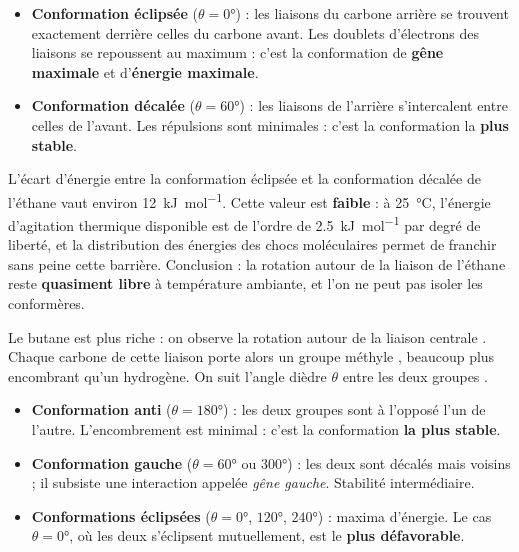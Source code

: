 \documentclass[11pt]{article}
\newcounter{popsec}
\newcounter{popsub}
\newcommand{\courssub}[1]{%
  \stepcounter{popsub}%
  \par\vspace{9pt}\noindent{\popxbold\fontsize{11.5}{13}\selectfont\color{popink}{\color{poporange}\thepopsec.\thepopsub}\hspace{6pt}#1}\par\nopagebreak\vspace{4pt}
}
\begin{document}
\begin{definition}
\begin{itemize}
\item \textbf{Conformation éclipsée} ($\theta = \ang{0}$) : les liaisons  du carbone arrière se trouvent exactement derrière celles du carbone avant. Les doublets d'électrons des liaisons se repoussent au maximum : c'est la conformation de \textbf{gêne maximale} et d'\textbf{énergie maximale}.
\item \textbf{Conformation décalée} ($\theta = \ang{60}$) : les liaisons de l'arrière s'intercalent entre celles de l'avant. Les répulsions sont minimales : c'est la conformation la \textbf{plus stable}.
\end{itemize}
\end{definition}

\begin{exemplebox}
L'écart d'énergie entre la conformation éclipsée et la conformation décalée de l'éthane vaut environ \SI{12}{kJ.mol^{-1}}. Cette valeur est \textbf{faible} : à \SI{25}{\celsius}, l'énergie d'agitation thermique disponible est de l'ordre de \SI{2,5}{kJ.mol^{-1}} par degré de liberté, et la distribution des énergies des chocs moléculaires permet de franchir sans peine cette barrière. Conclusion : la rotation autour de la liaison  de l'éthane reste \textbf{quasiment libre} à température ambiante, et l'on ne peut pas isoler les conformères.
\end{exemplebox}

\courssub{Conformations du butane}

Le butane  est plus riche : on observe la rotation autour de la liaison centrale . Chaque carbone de cette liaison porte alors un groupe méthyle , beaucoup plus encombrant qu'un hydrogène. On suit l'angle dièdre $\theta$ entre les deux groupes .

\begin{definition}
\begin{itemize}
\item \textbf{Conformation anti} ($\theta = \ang{180}$) : les deux groupes  sont à l'opposé l'un de l'autre. L'encombrement est minimal : c'est la conformation \textbf{la plus stable}.
\item \textbf{Conformation gauche} ($\theta = \ang{60}$ ou $\ang{300}$) : les deux  sont décalés mais voisins ; il subsiste une interaction appelée \emph{gêne gauche}. Stabilité intermédiaire.
\item \textbf{Conformations éclipsées} ($\theta = \ang{0}$, $\ang{120}$, $\ang{240}$) : maxima d'énergie. Le cas $\theta = \ang{0}$, où les deux  s'éclipsent mutuellement, est le \textbf{plus défavorable}.
\end{itemize}
\end{definition}
\end{document}
